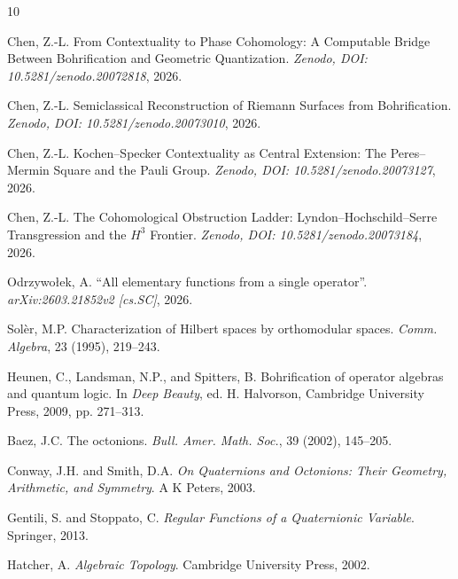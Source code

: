 \documentclass[11pt]{article}
\begin{document}
\begin{thebibliography}{10}

Chen, Z.-L.
From Contextuality to Phase Cohomology:
A Computable Bridge Between Bohrification and Geometric Quantization.
\textit{Zenodo, DOI: 10.5281/zenodo.20072818}, 2026.

Chen, Z.-L.
Semiclassical Reconstruction of Riemann Surfaces from Bohrification.
\textit{Zenodo, DOI: 10.5281/zenodo.20073010}, 2026.

Chen, Z.-L.
Kochen--Specker Contextuality as Central Extension: The Peres--Mermin Square and the Pauli Group.
\textit{Zenodo, DOI: 10.5281/zenodo.20073127}, 2026.

Chen, Z.-L.
The Cohomological Obstruction Ladder: Lyndon--Hochschild--Serre Transgression and the $H^3$ Frontier.
\textit{Zenodo, DOI: 10.5281/zenodo.20073184}, 2026.

Odrzywo{\l}ek, A.
``All elementary functions from a single operator''.
\textit{arXiv:2603.21852v2 [cs.SC]}, 2026.

Sol\`{e}r, M.P.
Characterization of Hilbert spaces by orthomodular spaces.
\textit{Comm. Algebra}, 23 (1995), 219--243.

Heunen, C., Landsman, N.P., and Spitters, B.
Bohrification of operator algebras and quantum logic.
In \textit{Deep Beauty}, ed. H. Halvorson, Cambridge University Press, 2009, pp. 271--313.

Baez, J.C.
The octonions.
\textit{Bull. Amer. Math. Soc.}, 39 (2002), 145--205.

Conway, J.H. and Smith, D.A.
\textit{On Quaternions and Octonions: Their Geometry, Arithmetic, and Symmetry}.
A K Peters, 2003.

Gentili, S. and Stoppato, C.
\textit{Regular Functions of a Quaternionic Variable}.
Springer, 2013.

Hatcher, A.
\textit{Algebraic Topology}.
Cambridge University Press, 2002.

\end{thebibliography}
\end{document}
